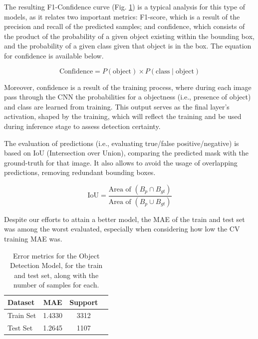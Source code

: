\documentclass[conference]{IEEEtran}
\begin{document}

The resulting F1-Confidence curve (Fig. \ref{tab:model03_results}) is a typical analysis for this type of models, as it relates two important metrics: F1-score, which is a result of the precision and recall of the predicted samples; and confidence, which consists of the product of the probability of a given object existing within the bounding box, and the probability of a given class given that object is in the box. The equation for confidence is available below.

\[
\text{Confidence} = P(\text{object}) \times P(\text{class} \mid \text{object})
\]

Moreover, confidence is a result of the training process, where during each image pass through the CNN the probabilities for a objectness (i.e., presence of object) and class are learned from training. This output serves as the final layer's activation, shaped by the training, which will reflect the training and be used during inference stage to assess detection certainty.

The evaluation of predictions (i.e., evaluating true/false positive/negative) is based on IoU (Intersection over Union), comparing the predicted mask with the ground-truth for that image. It also allows to avoid the usage of overlapping predictions, removing redundant bounding boxes.

\[
\text{IoU} = \frac{\text{Area of } (B_p \cap B_{gt})}{\text{Area of } (B_p \cup B_{gt})}
\]

Despite our efforts to attain a better model, the MAE of the train and test set was among the worst evaluated, especially when considering how low the CV training MAE was.

\begin{table}[H]
\centering
\caption{Error metrics for the Object Detection Model, for the train and test set, along with the number of samples for each.}
\label{tab:model03_results}
\begin{tabular}{lccc}
\toprule
\textbf{Dataset} & \textbf{MAE} & \textbf{Support} \\
\midrule
Train Set & 1.4330 & 3312 \\
Test Set & 1.2645 & 1107 \\
\bottomrule
\end{tabular}
\end{table}
\end{document}
